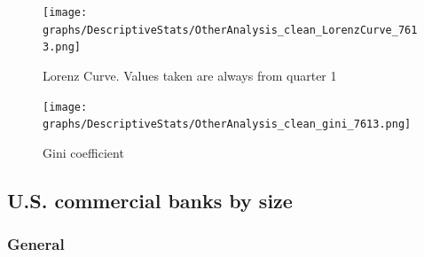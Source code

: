 \documentclass[12pt, a4paper]{article} %
\begin{document}
\begin{figure}[H]
\begin{minipage}{\textwidth}
\texttt{[image: graphs/DescriptiveStats/OtherAnalysis\_clean\_LorenzCurve\_7613.png]}
\caption[1]{Lorenz Curve. Values taken are always from quarter 1}
\label{fig:lorenz}
\end{minipage}
\end{figure}


\begin{figure}[H]
\begin{minipage}{\textwidth}
\texttt{[image: graphs/DescriptiveStats/OtherAnalysis\_clean\_gini\_7613.png]}
\centering
\caption[1]{Gini coefficient}
\label{fig:gini}
\end{minipage}
\end{figure}




\subsection{U.S. commercial banks by size}
\label{sec:banksByAssetSize}

\subsubsection{General}
\end{document}
